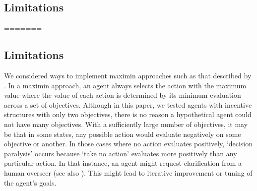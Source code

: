 \subsection{Limitations}


=======
\subsection{Limitations}

We considered ways to implement maximin approaches such as that described by \cite{vamplew_human-aligned_2018}. In a maximin approach, an agent always selects the action with the maximum value where the value of each action is determined by its minimum evaluation across a set of objectives. Although in this paper, we tested agents with incentive structures with only two objectives, there is no reason a hypothetical agent could not have many objectives. With a sufficiently large number of objectives, it may be that in some states, any possible action would evaluate negatively on some objective or another. In those cases where no action evaluates positively, `decision paralysis' occurs because `take no action' evaluates more positively than any particular action. %
 In that instance, an agent might request clarification from a human overseer (see also \cite{pmlr-v125-cohen20a}). This might lead to iterative improvement or tuning of the agent's goals.

